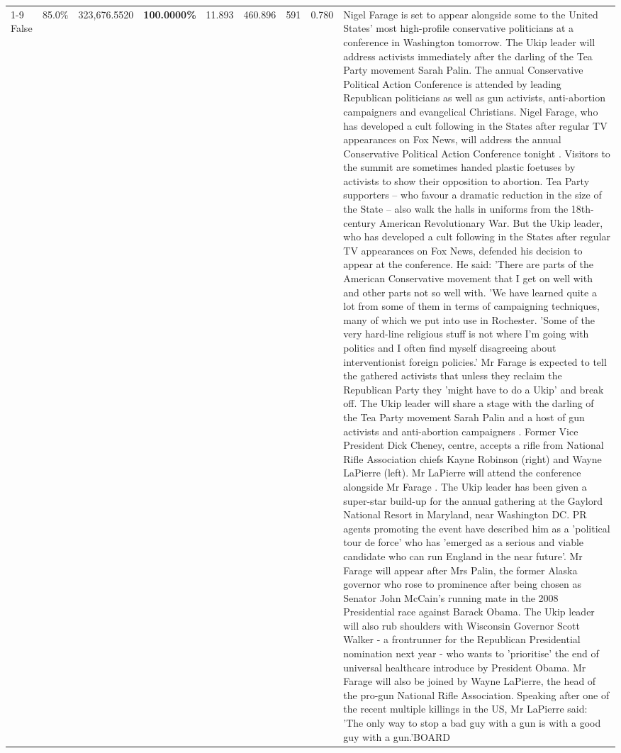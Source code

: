 \begin{table}[H]
\begin{tabular}{lllrlllll}
\cline{1-9}
False & 85.0\% & 323,676.5520 & \bfseries \color{red} 100.0000\% & 11.893 & 460.896 & 591 & 0.780 & Nigel Farage is set to appear alongside some to the United States' most high-profile conservative politicians at a conference in Washington tomorrow. The Ukip leader will address activists immediately after the darling of the Tea Party movement Sarah Palin. The annual Conservative Political Action Conference is attended by leading Republican politicians as well as gun activists, anti-abortion campaigners and evangelical Christians. Nigel Farage, who has developed a cult following in the States after regular TV appearances on Fox News, will address the annual Conservative Political Action Conference tonight . Visitors to the summit are sometimes handed plastic foetuses by activists to show their opposition to abortion. Tea Party supporters – who favour a dramatic reduction in the size of the State – also walk the halls in uniforms from the 18th-century American Revolutionary War. But the Ukip leader, who has developed a cult following in the States after regular TV appearances on Fox News, defended his decision to appear at the conference. He said: 'There are parts of the American Conservative movement that I get on well with and other parts not so well with. 'We have learned quite a lot from some of them in terms of campaigning techniques, many of which we put into use in Rochester. 'Some of the very hard-line religious stuff is not where I'm going with politics and I often find myself disagreeing about interventionist foreign policies.' Mr Farage is expected to tell the gathered activists that unless they reclaim the Republican Party they 'might have to do a Ukip' and break off. The Ukip leader will share a stage with the darling of the Tea Party movement Sarah Palin and a host of gun activists and anti-abortion campaigners . Former Vice President Dick Cheney, centre, accepts a rifle from National Rifle Association chiefs Kayne Robinson (right) and Wayne LaPierre (left). Mr LaPierre will attend the conference alongside Mr Farage . The Ukip leader has been given a super-star build-up for the annual gathering at the Gaylord National Resort in Maryland, near Washington DC. PR agents promoting the event have described him as a 'political tour de force' who has 'emerged as a serious and viable candidate who can run England in the near future'. Mr Farage will appear after Mrs Palin, the former Alaska governor who rose to prominence after being chosen as Senator John McCain's running mate in the 2008 Presidential race against Barack Obama. The Ukip leader will also rub shoulders with Wisconsin Governor Scott Walker - a frontrunner for the Republican Presidential nomination next year - who wants to 'prioritise' the end of universal healthcare introduce by President Obama. Mr Farage will also be joined by Wayne LaPierre, the head of the pro-gun National Rifle Association. Speaking after one of the recent multiple killings in the US, Mr LaPierre said: 'The only way to stop a bad guy with a gun is with a good guy with a gun.'BOARD \\

\end{tabular}
\end{table}
